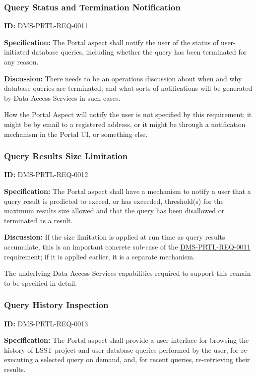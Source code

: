 \documentclass[SE,toc]{lsstdoc}
\begin{document}
\subsubsection{Query Status and Termination Notification}

\label{DMS-PRTL-REQ-0011}
\textbf{ID:} DMS-PRTL-REQ-0011

\textbf{Specification:}
The Portal aspect shall notify the user of the status of user-initiated database queries, including whether the query has been terminated for any reason.

\textbf{Discussion:}
There needs to be an operations discussion about when and why database queries are terminated, and what sorts of notifications will be generated by Data Access Services in such cases.

How the Portal Aspect will notify the user is not specified by this requirement; it might be by email to a registered address, or it might be through a notification mechanism in the Portal UI, or something else.

\subsubsection{Query Results Size Limitation}

\label{DMS-PRTL-REQ-0012}
\textbf{ID:} DMS-PRTL-REQ-0012

\textbf{Specification:}
The Portal aspect shall have a mechanism to notify a user that a query result is predicted to exceed, or has exceeded, threshold(s) for the maximum results size allowed and that the query has been disallowed or terminated as a result.

\textbf{Discussion:}
If the size limitation is applied at run time as query results accumulate, this is an important concrete sub-case of the \hyperref[DMS-PRTL-REQ-0011]{DMS-PRTL-REQ-0011} requirement; if it is applied earlier, it is a separate mechanism.

The underlying Data Access Services capabilities required to support this remain to be specified in detail.

\subsubsection{Query History Inspection}

\label{DMS-PRTL-REQ-0013}
\textbf{ID:} DMS-PRTL-REQ-0013

\textbf{Specification:}
The Portal aspect shall provide a user interface for browsing the history of LSST project and user database queries performed by the user, for re-executing a selected query on demand, and, for recent queries, re-retrieving their results.
\end{document}
